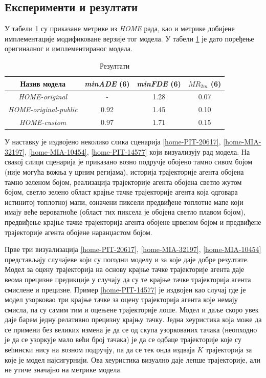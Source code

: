 \documentclass[11pt,oneside]{memoir}
\begin{document}
\subsection{Експерименти и резултати}

У табели \ref{heatmap-results} су приказане метрике из \textit{HOME} \cite{home} рада, као и метрике добијене
имплементације модификоване верзије тог модела. У табели
\ref{heatmap-results} је дато поређење оригиналног и имплементираног модела.

\begin{table}[H]
  \centering
  \begin{tabular}{c|c|c|c}
    Назив модела & \textit{minADE} (6) & \textit{minFDE} (6) & $MR_{2m}$ (6) \\
    \hline
    \textit{HOME-original} & - & 1.28 & 0.07 \\
    \textit{HOME-original-public} & 0.92 & 1.45 & 0.10 \\ 
    \textit{HOME-custom} & 0.97 & 1.71 & 0.15
  \end{tabular}
  \caption{Резултати}
  \label{heatmap-results}
\end{table}

У наставку је издвојено неколико слика сценарија \ref{home-PIT-20617}, \ref{home-MIA-32197}, \ref{home-MIA-10454}, \ref{home-PIT-14577} 
који визуализују рад модела. На свакој слици сценарија је приказано возно подручје обојено тамно сивом бојом (није могућа вожња
у црним регијама), историја трајекторије агента обојена тамно зеленом бојом, реализација трајекторије агента обојена светло жутом бојом,
светло зелено област крајње тачке трајекторије агента која одговара истинитој топлотној мапи, означени пиксели предвиђене топлотне мапе
који имају веће вероватноће (област тих пиксела је обојена светло плавом бојом), предвиђење крајње тачке трајекторија агента
обојене црвеном бојом и предвиђене трајекторије агента обојене наранџастом бојом.

Прве три визуализација \ref{home-PIT-20617}, \ref{home-MIA-32197}, \ref{home-MIA-10454} представљају случајеве који су погодни моделу
и за које даје добре резултате. Модел за оцену трајекторија на основу крајње тачке трајекторије агента даје веома прецизне
предикције у случају да су те крајње тачке трајекторија агента смислене и прецизне. Пример \ref{home-PIT-14577} је издвојен као случај
где је модел узорковао три крајње тачке за оцену трајекторија агента које немају смисла, па су самим тим и оцењене трајекторије лоше.
Модел и даље скоро увек даје барем једну релативно прецизну крајњу тачку. Једна хеуристика која може да се примени без великих измена је да
се од скупа узоркованих тачака (неопходно је да се узоркује мало већи број тачака) је да се одбаце трајекторије које су већински нису на возном
подручју, па да се тек онда издваја $K$ трајекторија за које је модел најсигурнији. Ова хеуристика визуално даје
лепше трајекторије, али не утиче значајно на метрике модела.
\end{document}
